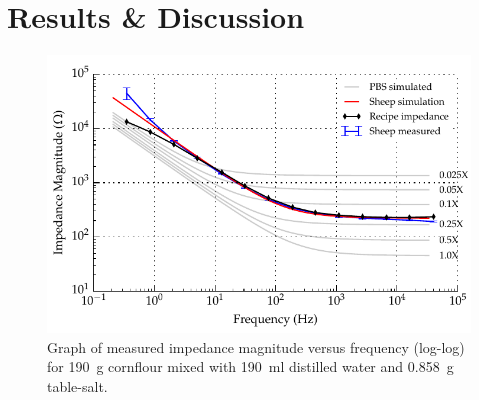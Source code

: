 %
%
%

\section{Results \& Discussion}

  \begin{figure}
      \centering
      \includegraphics[width=\textwidth]{content/pt2/graphics/run12_190ml-distilledWater_190g-cornflour_0g858-salt_ZVsF_graph_mag}
      \caption{\label{fig:recipe_cornflour_salt_extraWater_mag_improved}Graph of measured impedance magnitude versus frequency (log-log) for \SI{190}{\gram} cornflour mixed with \SI{190}{\milli\litre} distilled water and \SI{0.858}{\gram} table-salt.}
  \end{figure}

